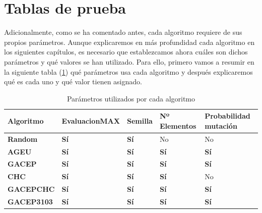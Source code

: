 \section{Tablas de prueba}

































\newpage
\newpage
\newpage
\newpage
Adicionalmente, como se ha comentado antes, cada algoritmo requiere de sus propios parámetros. 
Aunque explicaremos en más profundidad cada algoritmo en los siguientes capítulos, es necesario que establezcamos ahora cuáles son dichos parámetros y qué valores se han utilizado. 
Para ello, primero vamos a resumir en la siguiente tabla (\ref{table:Parametros}) qué parámetros usa cada algoritmo y después explicaremos qué es cada uno y qué valor tienen asignado.

\begin{table}[H]
\label{table:Parametros}
\caption{Parámetros utilizados por cada algoritmo}
\begin{tabular}{|l|l|l|l|l|}
\hline
\rowcolor[HTML]{F7EAC7} 
Algoritmo          & EvaluacionMAX & Semilla     & Nº Elementos & Probabilidad mutación \\ \hline
\rowcolor[HTML]{DAE8FC} 
\textbf{Random}    & \textbf{Sí}   & \textbf{Sí} & No           & No                    \\ \hline
\rowcolor[HTML]{DDFDFF} 
\textbf{AGEU}      & \textbf{Sí}   & \textbf{Sí} & \textbf{Sí}  & \textbf{Sí}           \\ \hline
\rowcolor[HTML]{DAE8FC} 
\textbf{GACEP}     & \textbf{Sí}   & \textbf{Sí} & \textbf{Sí}  & \textbf{Sí}           \\ \hline
\rowcolor[HTML]{DDFDFF} 
\textbf{CHC}       & \textbf{Sí}   & \textbf{Sí} & \textbf{Sí}  & No                    \\ \hline
\rowcolor[HTML]{DAE8FC} 
\textbf{GACEPCHC}  & \textbf{Sí}   & \textbf{Sí} & \textbf{Sí}  & \textbf{Sí}           \\ \hline
\rowcolor[HTML]{DDFDFF} 
\textbf{GACEP3103} & \textbf{Sí}   & \textbf{Sí} & \textbf{Sí}  & \textbf{Sí}           \\ \hline
\end{tabular}
\end{table}

